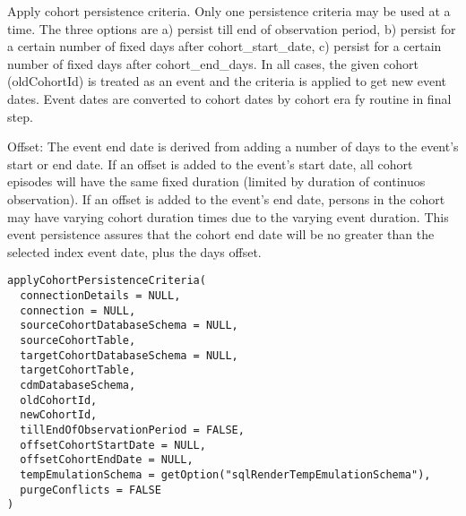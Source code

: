 \documentclass[a4paper]{book}
\begin{document}
%
\begin{Description}\relax
Apply cohort persistence criteria. Only one persistence criteria may be used at a time. The three options are a) persist till
end of observation period, b) persist for a certain number of fixed days after cohort\_start\_date, c) persist for
a certain number of fixed days after cohort\_end\_days. In all cases, the given cohort (oldCohortId) is treated as
an event and the criteria is applied to get new event dates. Event dates are converted to cohort dates by cohort
era fy routine in final step.

Offset: The event end date is derived from adding a number of days to the event's start or end date. If an offset is added to the
event's start date, all cohort episodes will have the same fixed duration (limited by duration of continuos observation).
If an offset is added to the event's end date, persons in the cohort may have varying cohort duration
times due to the varying event duration. This event persistence assures that the cohort end date will be no greater than
the selected index event date, plus the days offset.

\strong{[Experimental]}
\end{Description}
%
\begin{Usage}
\begin{verbatim}
applyCohortPersistenceCriteria(
  connectionDetails = NULL,
  connection = NULL,
  sourceCohortDatabaseSchema = NULL,
  sourceCohortTable,
  targetCohortDatabaseSchema = NULL,
  targetCohortTable,
  cdmDatabaseSchema,
  oldCohortId,
  newCohortId,
  tillEndOfObservationPeriod = FALSE,
  offsetCohortStartDate = NULL,
  offsetCohortEndDate = NULL,
  tempEmulationSchema = getOption("sqlRenderTempEmulationSchema"),
  purgeConflicts = FALSE
)
\end{verbatim}
\end{Usage}
%
\end{document}
